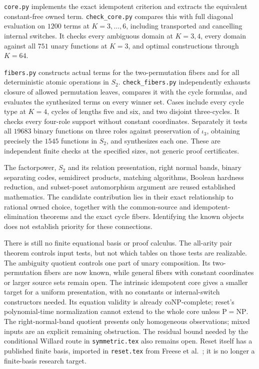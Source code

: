 \documentclass[11pt]{article}
\begin{document}
\texttt{core.py} implements the exact idempotent criterion and extracts
the equivalent constant-free owned term. \texttt{check\_core.py} compares
this with full diagonal evaluation on $1200$ terms at $K=3,\ldots,6$,
including transported and cancelling internal switches. It checks every
ambiguous domain at $K=3,4$, every domain against all $751$ unary functions
at $K=3$, and optimal constructions through $K=64$.

\texttt{fibers.py} constructs actual terms for the two-permutation
fibers and for all deterministic atomic operations in $S_2$.
\texttt{check\_fibers.py} independently exhausts closure of allowed
permutation leaves, compares it with the cycle formulas, and evaluates
the synthesized terms on every winner set. Cases include every cycle
type at $K=4$, cycles of lengths five and six, and two disjoint
three-cycles. It checks every four-role support without constant
coordinates. Separately it tests all $19683$ binary functions on three
roles against preservation of $\iota_3$, obtaining precisely the $1545$
functions in $S_2$, and synthesizes each one. These are independent
finite checks at the specified sizes, not generic proof certificates.

The factorpower, $S_2$ and its relation presentation, right normal bands,
binary separating codes, semidirect products, matching algorithms,
Boolean hardness reduction, and subset-poset automorphism argument are
reused established mathematics. The candidate contribution lies in
their exact relationship to rational owned choice, together with the
common-source and idempotent-elimination theorems and the exact cycle
fibers. Identifying the known objects does not establish priority for
these connections.

There is still no finite equational basis or proof calculus. The
all-arity pair theorem controls input tests, but not which tables on
those tests are realizable. The ambiguity quotient controls one part of
unary composition. Its two-permutation fibers are now known, while
general fibers with constant coordinates or larger source sets remain
open. The intrinsic idempotent core gives a smaller target for a uniform
presentation, with no constants or internal-switch constructors needed.
Its equation validity is already coNP-complete; reset's polynomial-time
normalization cannot extend to the whole core unless $\mathrm P=\mathrm{NP}$.
The right-normal-band quotient presents only homogeneous observations;
mixed inputs are an explicit remaining obstruction. The residual
bound needed by the conditional Willard route in \texttt{symmetric.tex}
also remains open. Reset itself has a published finite basis, imported
in \texttt{reset.tex} from Freese et al.\ \cite[Theorem~3.7]{FreeseEtAl2002};
it is no longer a finite-basis research target.
\end{document}
